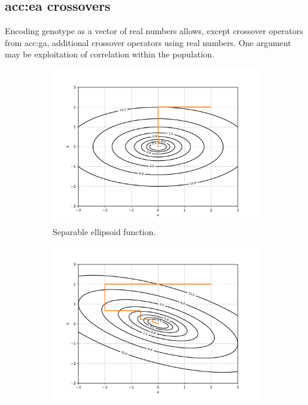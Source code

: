 \subsection{\texorpdfstring{\acrshort*{acc:ea} crossovers}{Crossovers}}

Encoding genotype as a vector of real numbers allows, except crossover operators from \acrshort{acc:ga}, additional crossover operators using real numbers. One argument may be exploitation of correlation within the population.

\begin{figure}
    \begin{subfigure}[t]{0.49\textwidth}
        \includegraphics[width=\textwidth]{img/render_separable.pdf}
        \caption{Separable ellipsoid function.}
        \label{fig:separableelipsoid}
    \end{subfigure}
    \hfill
    \begin{subfigure}[t]{0.49\textwidth}
        \includegraphics[width=\textwidth]{img/render_nonseparable.pdf}

\end{subfigure}
\end{figure}
